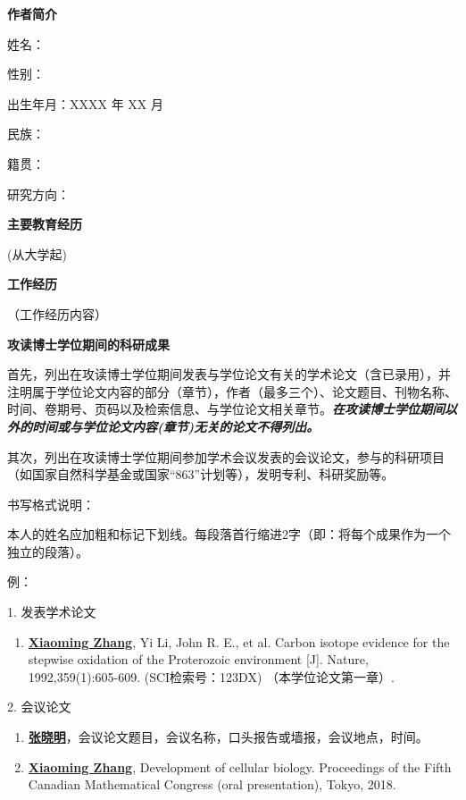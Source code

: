 
\begin{achievement}

{\bf 作者简介}

姓名：

性别：

出生年月：XXXX 年 XX 月

民族：

籍贯：

研究方向：

{\bf 主要教育经历}

(从大学起)

{\bf 工作经历}

（工作经历内容）

{\bf 攻读博士学位期间的科研成果}

首先，列出在攻读博士学位期间发表与学位论文有关的学术论文（含已录用），并注明属于学位论文内容的部分（章节），作者（最多三个）、论文题目、刊物名称、时间、卷期号、页码以及检索信息、与学位论文相关章节。{\bfseries\itshape 在攻读博士学位期间以外的时间或与学位论文内容(章节)无关的论文不得列出。}

其次，列出在攻读博士学位期间参加学术会议发表的会议论文，参与的科研项目（如国家自然科学基金或国家“863”计划等），发明专利、科研奖励等。

书写格式说明：

本人的姓名应加粗和标记下划线。每段落首行缩进2字（即：将每个成果作为一个独立的段落）。

例：

1. 发表学术论文
\begin{enumerate}[nosep, label=$\lbrack$\arabic*$\rbrack$]
  \item{\underline{\bf Xiaoming Zhang}, Yi Li, John R. E., et al. Carbon isotope evidence for the stepwise oxidation of the Proterozoic environment [J]. Nature, 1992,359(1):605-609. (SCI检索号：123DX) （本学位论文第一章）.}
\end{enumerate}{}\vspace{1em}

2. 会议论文
\begin{enumerate}[nosep, label=$\lbrack$\arabic*$\rbrack$]
  \item{\underline{\bf 张晓明}，会议论文题目，会议名称，口头报告或墙报，会议地点，时间。}
  \item{\underline{\bf Xiaoming Zhang}, Development of cellular biology. Proceedings of the Fifth Canadian Mathematical Congress (oral presentation), Tokyo, 2018.}
\end{enumerate}{}\vspace{1em}


\end{achievement}
